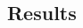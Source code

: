 \documentclass[final]{beamer}
\begin{document}
\begin{frame}[t]
\begin{multicols}{3}
\section{Results}



\end{multicols}
\end{frame}
\end{document}
